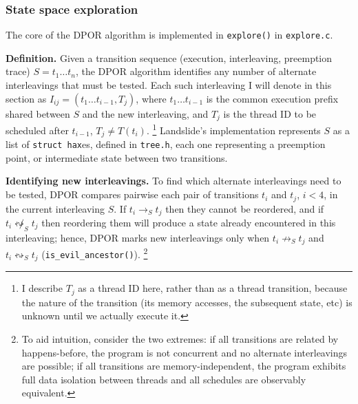 \subsubsection{State space exploration}

The core of the DPOR algorithm is implemented in {\tt explore()} in {\tt explore.c}.

{\bf Definition.}
Given a transition sequence (execution, interleaving, preemption trace) $S = t_1 \dots t_n$,
the DPOR algorithm identifies any number of alternate interleavings that must be tested.
Each such interleaving I will denote in this section as $I_{ij} = (t_1 \dots t_{i-1}, T_j)$,
where $t_1 \dots t_{i-1}$ is the common execution prefix shared between $S$ and the new interleaving,
and $T_j$ is the thread ID to be scheduled after $t_{i-1}$, $T_j \ne T(t_i)$.
\footnote{I describe $T_j$ as a thread ID here, rather than as a thread transition,
because the nature of the transition (its memory accesses, the subsequent state, etc)
is unknown until we actually execute it.}
Landslide's implementation represents $S$ as a list of {\tt struct hax}es, defined in {\tt tree.h},
each one representing a preemption point, or intermediate state between two transitions.

{\bf Identifying new interleavings.}
To find which alternate interleavings need to be tested,
DPOR compares pairwise each pair of transitions $t_i$ and $t_j$, $i<4$, in the current interleaving $S$.
If $t_i \rightarrow_S t_j$ then they cannot be reordered,
and if $t_i \not\leftrightsquigarrow_S t_j$ then reordering them
will produce a state already encountered in this interleaving;
hence, DPOR marks new interleavings only
when $t_i \not\rightarrow_S t_j$ and $t_i \leftrightsquigarrow_S t_j$
({\tt is\_evil\_ancestor()}).
\footnote{To aid intuition, consider the two extremes:
if all transitions are related by happens-before,
the program is not concurrent and no alternate interleavings are possible;
if all transitions are memory-independent,
the program exhibits full data isolation between threads and all schedules are observably equivalent.}

